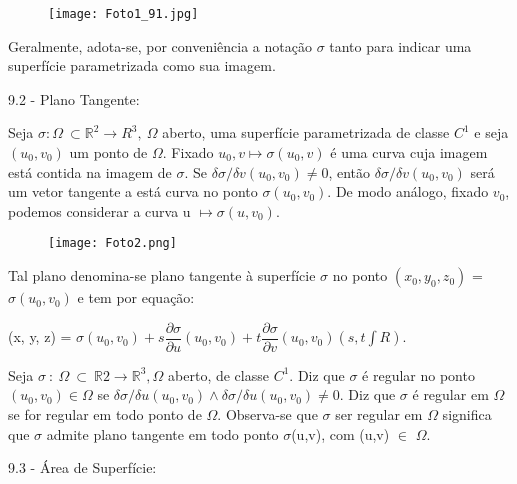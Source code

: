 \documentclass[11pt,a4paper]{article}
\begin{document}
	\begin{figure}[h]	
	\centering %
	\texttt{[image: Foto1\_91.jpg]} 
	\end{figure}
	
	Geralmente, adota-se, por conveniência a notação $\sigma$ tanto para indicar uma superfície parametrizada como sua imagem.\\
	
	
	\begin{large}
		9.2 - Plano Tangente:
	\end{large}
	
	Seja $\sigma : \Omega \ \subset \mathbb{R}^2 \rightarrow R^3,\ \Omega$ aberto, uma superfície parametrizada de classe $C^1$ e seja $(u_0,v_0)$ um ponto de $\Omega$. Fixado $u_0,v \mapsto \sigma(u_0,v)$ é uma curva cuja imagem está contida na imagem de $\sigma$. Se $\delta\sigma / \delta v(u_0,v_0)\neq 0$, então  $\delta\sigma / \delta v(u_0,v_0)$ será um vetor tangente a está curva no ponto $\sigma(u_0,v_0)$. De modo análogo, fixado $v_0$, podemos considerar a curva u $\mapsto \sigma (u,v_0)$.\\
	\begin{figure}[h]	
	\centering %
	\texttt{[image: Foto2.png]} 
	\end{figure}
	
	Tal plano denomina-se plano tangente à superfície $\sigma$ no ponto $(x_0, y_0, z_0)$ = $\sigma(u_0, v_0)$ e tem por equação:\\
	
	\begin{center}
		(x, y, z) = $\sigma(u_0,v_0) + s\dfrac{\partial\sigma}{\partial u}(u_0,v_0) + t\dfrac{\partial\sigma }{\partial v}(u_0,v_0) (s,t \int R)$.
	\end{center}
	
	Seja $\sigma\ :\ \Omega \ \subset \ \mathbb{R}2 \rightarrow \mathbb{R}^3, \Omega$ aberto, de classe $C^1$. Diz que $\sigma$ é regular no ponto $(u_0, v_0) \in \Omega$ se $\delta\sigma / \delta u (u_0, v_0) \wedge \delta\sigma / \delta u (u_0, v_0) \neq 0$. Diz que $\sigma$ é regular em $\Omega$ se for regular em todo ponto de $\Omega$. Observa-se que $\sigma$ ser regular em $\Omega$ significa que $\sigma$ admite plano tangente em todo ponto $\sigma$(u,v), com (u,v) $\in$ $\Omega$.\\
	
	\begin{large}
		9.3 - Área de Superfície:
	\end{large}
	
\end{document}
